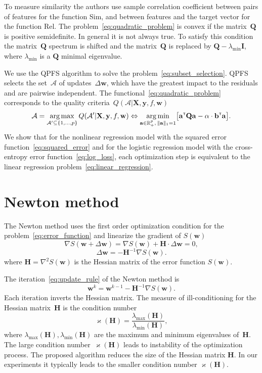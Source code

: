 \documentclass[a4paper,12pt]{article}
\renewcommand{\kappa}{\ensuremath{\varkappa}}
\theoremstyle{plain} %
\theoremstyle{definition} %
\theoremstyle{remark} %
\newcommand{\ba}{\mathbf{a}}
\newcommand{\bw}{\mathbf{w}}
\newcommand{\by}{\mathbf{y}}
\newcommand{\cA}{\mathcal{A}}
\newcommand{\bQ}{\mathbf{Q}}
\newcommand{\bbR}{\mathbb{R}}
\newcommand{\bH}{\mathbf{H}}
\newcommand{\bX}{\mathbf{X}}
\newcommand{\T}{{\text{\tiny\sffamily\upshape\mdseries T}}}
\newcommand{\argmin}{\mathop{\arg \min}\limits}
\newcommand{\argmax}{\mathop{\arg \max}\limits}
\begin{document}
To measure similarity the authors use sample correlation coefficient between pairs of features for the function Sim, and between features and the target vector for the function Rel.
The problem~\eqref{eq:quadratic_problem} is convex if the matrix~$\bQ$ is positive semidefinite. In general it is not always true. 
To satisfy this condition the matrix~$\bQ$ spectrum is shifted and the matrix~$\bQ$ is replaced by $\bQ - \lambda_{\text{min}} \mathbf{I}$, where $\lambda_{\text{min}} $ is a $\bQ$ minimal eigenvalue.

We use the QPFS algorithm to solve the problem~\eqref{eq:subset_selection}.
QPFS selects the set~$\cA$ of updates~$\Delta \bw$, which have the greatest impact to the residuals and are pairwise independent.
The functional~\eqref{eq:quadratic_problem} corresponds to the quality criteria~$Q(\cA | \bX, \by, f, \bw)$
\begin{equation}
\cA = \argmax_{\cA' \subseteq \{1, \dots, p\}} Q(\cA' | \bX, \by, f, \bw) \Leftrightarrow \argmin_{\ba  \in \bbR^p_+, \, \|\ba\|_1=1} \bigl[\ba^{\T} \bQ \ba - \alpha \cdot \mathbf{b}^{\T} \ba \bigr].
\end{equation}
We show that for the nonlinear regression model with the squared error function~\eqref{eq:squared_error} and for the logistic regression model with the cross-entropy error function~\eqref{eq:log_loss}, each optimization step is equivalent to the linear regression problem~\eqref{eq:linear_regression}.

	\section*{Newton method}
The Newton method uses the first order optimization condition for the problem~\eqref{eq:error_function} and linearize the gradient of $S(\bw)$
\[
\nabla S (\bw + \Delta \bw) = \nabla S(\bw) + \bH \cdot \Delta \bw = 0,
\]
\[
\Delta \bw = - \bH^{-1} \nabla S(\bw).
\]
where $\bH = \nabla^2 S(\bw)$ is the Hessian matrix of the error function $S(\bw)$.

The iteration~\eqref{eq:update_rule} of the Newton method is
\[
\bw^k = \bw^{k-1} - \bH^{-1} \nabla S(\bw).
\]
Each iteration inverts the Hessian matrix.
The measure of ill-conditioning for the Hessian matrix~$\bH$ is the condition number
\[
\kappa(\bH) = \frac{\lambda_{\text{max}}(\bH)}{\lambda_{\text{min}}(\bH)},
\]
where $\lambda_{\text{max}}(\bH), \lambda_{\text{min}}(\bH)$ are the maximum and minimum eigenvalues of~$\bH$. The large condition number~$\kappa(\bH)$ leads to instability of the optimization process.
The proposed algorithm reduces the size of the Hessian matrix $\bH$. In our experiments it typically leads to the smaller condition number $\kappa(\bH)$.
\end{document}
